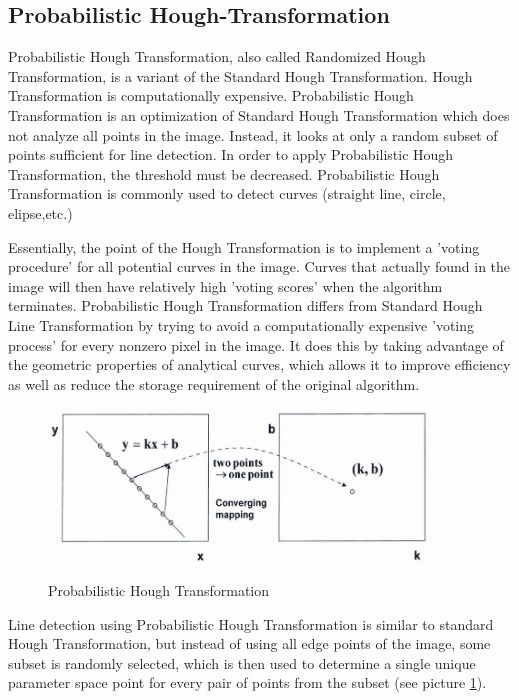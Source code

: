 %
\subsection{Probabilistic Hough-Transformation}\label{sec:Probabilistic Hough-Transformation}
%

Probabilistic Hough Transformation, also called Randomized Hough Transformation, is a variant of the Standard Hough Transformation. Hough Transformation is computationally expensive. Probabilistic Hough Transformation is an optimization of Standard Hough Transformation which does not analyze all points in the image. Instead, it looks at only a random subset of points sufficient for line detection. In order to apply Probabilistic Hough Transformation, the threshold must be decreased. Probabilistic Hough Transformation is commonly used to detect curves (straight line, circle, elipse,etc.) 




Essentially, the point of the Hough Transformation is to implement a 'voting procedure' for all potential curves in the image. Curves that actually found in the image will then have relatively high 'voting scores' when the algorithm terminates. Probabilistic Hough Transformation differs from Standard Hough Line Transformation by trying to avoid a computationally expensive 'voting process' for every nonzero pixel in the image. It does this by taking advantage of the geometric properties of analytical curves, which allows it to improve efficiency as well as reduce the storage requirement of the original algorithm.


 \begin{figure}[H]
 \centering
  \includegraphics[width=0.9\textwidth]{./Bilder/Probabilistic_HT.png}\label{Probabilistic_HT_fig}
  \caption{Probabilistic Hough Transformation}
\end{figure}

Line detection using Probabilistic Hough Transformation is similar to standard Hough Transformation, but instead of using all edge points of the image, some subset is randomly selected, which is then used to determine a single unique parameter space point for every pair of points from the subset (see picture \ref{Probabilistic_HT_fig}).

